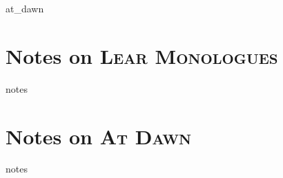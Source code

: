 \documentclass[ebook, twoside,openright, final]{memoir}
\begin{document}
{at_dawn}

\renewcommand\appendixname{Notes}
\renewcommand\appendixpagename{Notes}
\renewcommand\appendixtocname{Notes}

\backmatter
\appendix
{}


\chapter{Notes on \textsc{Lear Monologues}}
\thispagestyle{myheadings}
{notes}

\chapter{Notes on \textsc{At Dawn}}
\thispagestyle{myheadings}
{notes}
\end{document}
